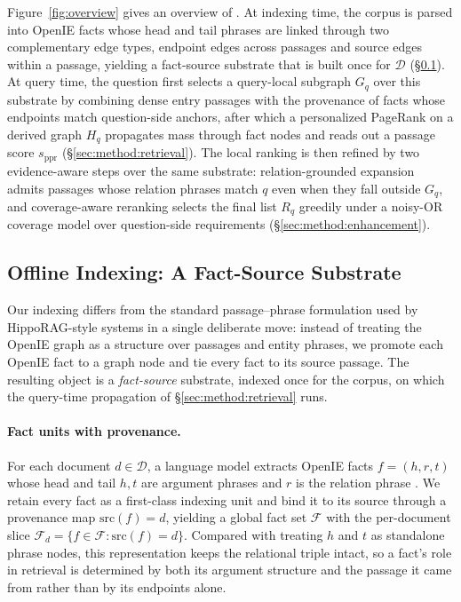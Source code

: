 Figure~\ref{fig:overview} gives an overview of \methodname{}. At
indexing time, the corpus is parsed into OpenIE facts whose head and
tail phrases are linked through two complementary edge types,
endpoint edges across passages and source edges within a passage,
yielding a fact-source substrate that is built once for $\mathcal{D}$
(\S\ref{sec:method:substrate}). At query time, the question first
selects a query-local subgraph $G_q$ over this substrate by combining
dense entry passages with the provenance of facts whose endpoints
match question-side anchors, after which a personalized PageRank on a
derived graph $H_q$ propagates mass through fact nodes and reads out
a passage score $s_{\mathrm{ppr}}$
(\S\ref{sec:method:retrieval}). The local ranking is then refined by
two evidence-aware steps over the same substrate: relation-grounded
expansion admits passages whose relation phrases match $q$ even when
they fall outside $G_q$, and coverage-aware reranking selects the
final list $R_q$ greedily under a noisy-OR coverage model over
question-side requirements (\S\ref{sec:method:enhancement}).

\subsection{Offline Indexing: A Fact-Source Substrate}
\label{sec:method:substrate}

Our indexing differs from the standard passage--phrase formulation used
by HippoRAG-style systems in a single deliberate move: instead of
treating the OpenIE graph as a structure over passages and entity
phrases, we promote each OpenIE fact to a graph node and tie every
fact to its source passage. The resulting object is a
\emph{fact-source} substrate, indexed once for the corpus, on which
the query-time propagation of \S\ref{sec:method:retrieval} runs.

\paragraph{Fact units with provenance.}
For each document $d \in \mathcal{D}$, a language model extracts
OpenIE facts $f=(h,r,t)$ whose head and tail $h, t$ are argument
phrases and $r$ is the relation phrase
\citep{angeli2015leveraging,gutierrez2025hipporag}. We retain every
fact as a first-class indexing unit and bind it to its source through
a provenance map $\mathrm{src}(f)=d$, yielding a global fact set
$\mathcal{F}$ with the per-document slice
$\mathcal{F}_d = \{f\in\mathcal{F} : \mathrm{src}(f)=d\}$. Compared
with treating $h$ and $t$ as standalone phrase nodes, this
representation keeps the relational triple intact, so a fact's role
in retrieval is determined by both its argument structure and the
passage it came from rather than by its endpoints alone.

